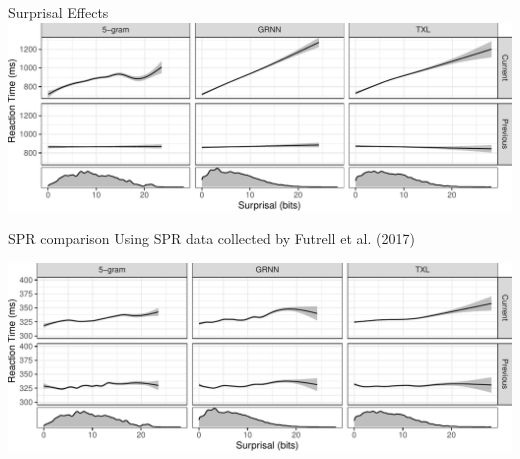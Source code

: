 \documentclass[ 12pt, xcolor=beamer,table,usenames,dvipsnames, ignorenonframetext, ngerman]{beamer}
\begin{document}
\begin{frame}{Surprisal Effects}
	\includegraphics[width=\textwidth]{../Images/amaze_gam.pdf}	
\end{frame}


\begin{frame}{SPR comparison}
	Using SPR data collected by Futrell et al. (2017)
	
	\includegraphics[width=\textwidth]{../Images/spr_gam.pdf}
	
\end{frame}
\end{document}
